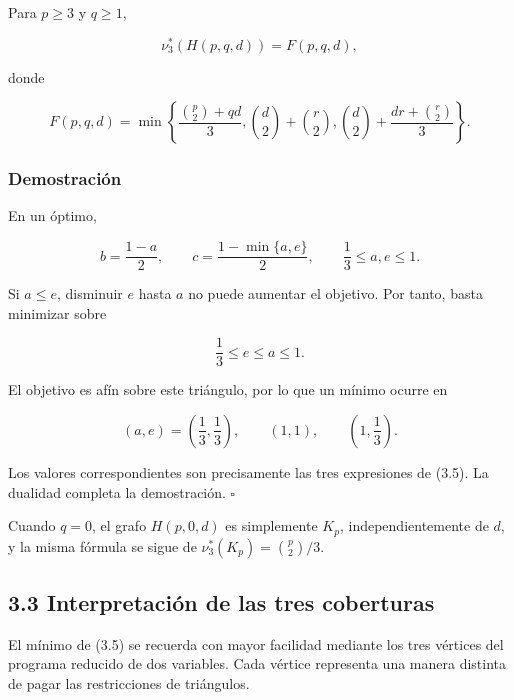 \documentclass[spanish,11pt,a4paper]{article}
\begin{document}
Para \(p\ge3\) y \(q\ge1\),

\[
\boxed{
\nu_3^*(H(p,q,d))
=
F(p,q,d)
},
\tag{3.4}
\]

donde

\[
\boxed{
F(p,q,d)
=
\min\left\{
\frac{\binom p2+qd}{3},
\binom d2+\binom r2,
\binom d2+\frac{dr+\binom r2}{3}
\right\}
}.
\tag{3.5}
\]

\subsubsection{Demostración}\label{demostraciuxf3n}

En un óptimo,

\[
b=\frac{1-a}{2},
\qquad
c=\frac{1-\min\{a,e\}}2,
\qquad
\frac13\le a,e\le1.
\]

Si \(a\le e\), disminuir \(e\) hasta \(a\) no puede aumentar el
objetivo. Por tanto, basta minimizar sobre

\[
\frac13\le e\le a\le1.
\]

El objetivo es afín sobre este triángulo, por lo que un mínimo ocurre en

\[
(a,e)=\left(\frac13,\frac13\right),
\qquad
(1,1),
\qquad
\left(1,\frac13\right).
\]

Los valores correspondientes son precisamente las tres expresiones de
(3.5). La dualidad completa la demostración. \(\square\)

Cuando \(q=0\), el grafo \(H(p,0,d)\) es simplemente \(K_p\),
independientemente de \(d\), y la misma fórmula se sigue de
\(\nu_3^*(K_p)=\binom p2/3\).

\subsection{3.3 Interpretación de las tres
coberturas}\label{interpretaciuxf3n-de-las-tres-coberturas}

El mínimo de (3.5) se recuerda con mayor facilidad mediante los tres
vértices del programa reducido de dos variables. Cada vértice representa
una manera distinta de pagar las restricciones de triángulos.
\end{document}
